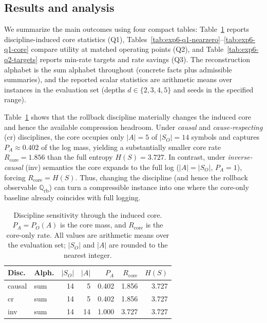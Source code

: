 \documentclass[twoside]{article}
\newcommand{\1}{\mathbf{1}}
\begin{document}
\subsection{Results and analysis}
\label{sec:exp63-results}

We summarize the main outcomes using four compact tables: Table~\ref{tab:exp6-core-stats} reports discipline-induced core statistics (Q1), Tables~\ref{tab:exp6-q1-nearzero}--\ref{tab:exp6-q1-core} compare utility at matched operating points (Q2), and Table~\ref{tab:exp6-q2-targets} reports min-rate targets and rate savings (Q3). The reconstruction alphabet is the sum alphabet throughout (concrete facts plus admissible summaries), and the reported scalar statistics are arithmetic means over instances in the evaluation set (depths \(d\in\{2,3,4,5\}\) and seeds in the specified range).

Table~\ref{tab:exp6-core-stats} shows that the rollback discipline materially changes the induced core and hence the available compression headroom.
Under \emph{causal} and \emph{cause-respecting} (cr) disciplines, the core occupies only \(|A|=5\) of \(|S_O|=14\) symbols and captures
\(P_A\approx 0.402\) of the log mass, yielding a substantially smaller core rate \(R_{\mathrm{core}}=1.856\) than the full entropy \(H(S)=3.727\).
In contrast, under \emph{inverse-causal} (inv) semantics the core expands to the full log (\(|A|=|S_O|\), \(P_A=1\)), forcing
\(R_{\mathrm{core}}=H(S)\).
Thus, changing the discipline (and hence the rollback observable \(\mathbb Q_{\mathrm{rb}}\)) can turn a compressible instance
into one where the core-only baseline already coincides with full logging.

\begin{table}[t]
\centering
\small
\setlength{\tabcolsep}{5.0pt}
\renewcommand{\arraystretch}{1.15}
\begin{tabular}{@{}llrrrrr@{}}
\toprule
Disc. & Alph. & \(|S_O|\) & \(|A|\) & \(P_A\) & \(R_{\mathrm{core}}\) & \(H(S)\) \\
\midrule
causal & sum & 14 & 5  & 0.402 & 1.856 & 3.727 \\
cr     & sum & 14 & 5  & 0.402 & 1.856 & 3.727 \\
inv    & sum & 14 & 14 & 1.000 & 3.727 & 3.727 \\
\bottomrule
\end{tabular}
\caption{Discipline sensitivity through the induced core.
\(P_A=P_O(A)\) is the core mass, and \(R_{\mathrm{core}}\) is the core-only rate.
All values are arithmetic means over the evaluation set; \(|S_O|\) and \(|A|\) are
rounded to the nearest integer.}
\label{tab:exp6-core-stats}
\end{table}
\end{document}
